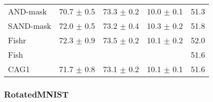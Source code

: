 \documentclass{article}
\begin{document}
\begin{center}
{\begin{tabular}{lcccc}
AND-mask             & 70.7 $\pm$ 0.5       & 73.3 $\pm$ 0.2       & 10.0 $\pm$ 0.1       & 51.3                 \\
SAND-mask            & 72.0 $\pm$ 0.5       & 73.2 $\pm$ 0.4       & 10.3 $\pm$ 0.2       & 51.8                 \\
Fishr                & 72.3 $\pm$ 0.9       & 73.5 $\pm$ 0.2       & 10.1 $\pm$ 0.2       & 52.0                 \\
Fish                 &                      &                      &                      & 51.6                 \\
\midrule
CAG1                 & 71.7 $\pm$ 0.8       & 73.1 $\pm$ 0.2       & 10.1 $\pm$ 0.1       & 51.6                 \\
\bottomrule
\end{tabular}}
\end{center}

\subsubsection{RotatedMNIST}
\end{document}
